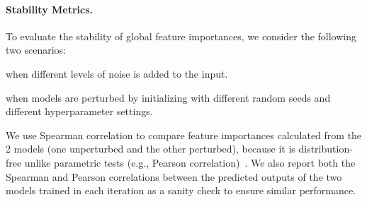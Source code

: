 \paragraph{Stability Metrics.}
To evaluate the stability of global feature importances, we consider the following two scenarios:
\begin{enumerate*}
    \item when different levels of noise is added to the input.
    \item when models are perturbed by initializing with different random seeds and different hyperparameter settings.
\end{enumerate*}
We use Spearman correlation to compare feature importances calculated from the 2 models (one unperturbed and the other perturbed), because it is distribution-free unlike parametric tests (e.g., Pearson correlation)~\cite{zwillinger1999crc}. We also report both the Spearman and Pearson correlations between the predicted outputs of the two models trained in each iteration as a sanity check to ensure similar performance.




